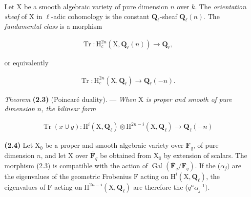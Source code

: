 \documentclass[10pt,leqno]{article}
\begin{document}
\noindent Let \(\mathrm{X}\) be a smooth algebraic variety of pure dimension \(n\) over \(k\). The \emph{orientation sheaf} of \(\mathrm{X}\) in \(\ell \)-adic cohomology is the constant \(\mathbf{Q}_{\ell }\)-sheaf \(\mathbf{Q}_{\ell }(n)\). The \emph{fundamental class} is a morphism\par

\begin{equation*}\begin{gathered}\operatorname{Tr} : \mathrm{H}_{c}^{2n}(\mathrm{X},\mathbf{Q}_{\ell }(n)) \longrightarrow  \mathbf{Q}_{\ell },\end{gathered}\end{equation*}

\noindent or equivalently\par

\begin{equation*}\begin{gathered}\operatorname{Tr} : \mathrm{H}_{c}^{2n}(\mathrm{X},\mathbf{Q}_{\ell }) \longrightarrow  \mathbf{Q}_{\ell }(- n).\end{gathered}\end{equation*}

\noindent \emph{Theorem} \textbf{(2.3)} (Poincaré duality). — {\itshape When \(\mathrm{X}\) is proper and smooth of pure dimension \(n\), the bilinear form}\par

\begin{equation*}\begin{gathered}\operatorname{Tr}(x\cup y) : \mathrm{H}^{i}(\mathrm{X},\mathbf{Q}_{\ell })\otimes \mathrm{H}^{2n- i}(\mathrm{X},\mathbf{Q}_{\ell }) \longrightarrow  \mathbf{Q}_{\ell }(- n)\end{gathered}\end{equation*}

\par

\noindent \textbf{(2.4)} Let \(\mathrm{X}_{0}\) be a proper and smooth algebraic variety over \(\mathbf{F}_{q}\), of pure dimension \(n\), and let \(\mathrm{X}\) over \(\overline{\mathbf{F}}_{q}\) be obtained from \(\mathrm{X}_{0}\) by extension of scalars. The morphism (2.3) is compatible with the action of \(\operatorname{Gal}(\overline{\mathbf{F}}_{q}/\mathbf{F}_{q})\). If the (\(\alpha _{j})\) are the eigenvalues of the geometric Frobenius \(\mathrm{F}\) acting on \(\mathrm{H}^{i}(\mathrm{X},\mathbf{Q}_{\ell })\), the eigenvalues of \(\mathrm{F}\) acting on \(\mathrm{H}^{2n- i}(\mathrm{X},\mathbf{Q}_{\ell })\) are therefore the (\(q^{n} \alpha _{j}^{- 1})\).\par
\end{document}
